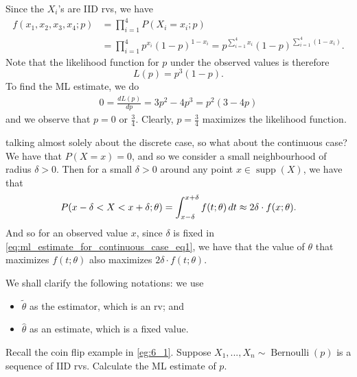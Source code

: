 \documentclass[notoc,notitlepage]{tufte-book}
\DeclareMathOperator{\Bernoulli}{Bernoulli }
\DeclareMathOperator{\supp}{supp }
\begin{document}
\begin{solution}
  Since the $X_i$'s are IID rvs, we have
  \begin{align*}
    f(x_1, x_2, x_3, x_4 ; p) &= \prod_{i=1}^{4} P(X_i = x_i ; p) \\
                              &= \prod_{i=1}^{4} p^{x_i} (1 - p)^{1 - x_i} = p^{\sum_{i=1}^{4} x_i} (1 - p)^{\sum_{i=1}^{4} ( 1 - x_i )}.
  \end{align*}
  Note that the likelihood function for $p$ under the observed values is therefore
  \begin{equation*}
    L(p) = p^3 (1 - p).
  \end{equation*}
  To find the ML estimate, we do
  \begin{align}
    0 = \frac{dL(p)}{dp} = 3p^2 - 4p^3 = p^2( 3 - 4p )
  \end{align}
  and we observe that $p = 0$ or $\frac{3}{4}$. Clearly, $p = \frac{3}{4}$ maximizes the likelihood function.
\end{solution}

\begin{note}
   talking almost solely about the discrete case, so what about the continuous case? We have that $P(X = x) = 0$, and so we consider a small neighbourhood of radius $\delta > 0$. Then for a small $\delta > 0$ around any point $x \in \supp(X)$, we have that
  \begin{equation}\label{eq:ml_estimate_for_continuous_case_eq1}
    P( x - \delta < X < x + \delta; \theta ) = \int_{x - \delta}^{x + \delta} f(t; \theta) \mathop{}\!d{t} \approx 2 \delta \cdot f(x; \theta).
  \end{equation}
  And so for an observed value $x$, since $\delta$ is fixed in \cref{eq:ml_estimate_for_continuous_case_eq1}, we have that the value of $\theta$ that maximizes $f(t; \theta)$ also maximizes $2 \delta \cdot f(t ; \theta)$.
\end{note}

\begin{warning}
  We shall clarify the following notations: we use
  \begin{itemize}
    \item $\tilde{\theta}$ as the estimator, which is an rv; and
    \item $\hat{\theta}$ as an estimate, which is a fixed value.
  \end{itemize}
\end{warning}

\begin{eg}\label{eg:6_2}
  Recall the coin flip example in \cref{eg:6_1}. Suppose $X_1, ..., X_n \sim \Bernoulli(p)$ is a sequence of IID rvs. Calculate the ML estimate of $p$.
\end{eg}
\end{document}
